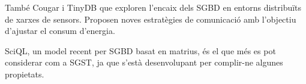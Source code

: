 També Cougar i TinyDB que exploren l'encaix dels SGBD en entorns distribuïts de xarxes de sensors. Proposen noves estratègies de comunicació amb l'objectiu d'ajustar el consum d'energia. 


SciQL, un model recent per SGBD  basat en matrius, és el que més es pot considerar com a SGST, ja que s'està desenvolupant per complir-ne algunes propietats.




